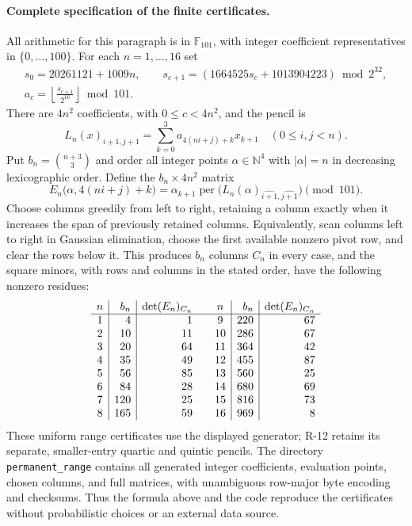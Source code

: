\paragraph{Complete specification of the finite certificates.}
All arithmetic for this paragraph is in $\mathbb F_{101}$, with
integer coefficient representatives in $\{0,\ldots,100\}$.
For each $n=1,\ldots,16$ set
\[
\begin{gathered}
 s_0=20261121+1009n,\qquad
 s_{c+1}=(1664525s_c+1013904223)\bmod2^{32},\\
 a_c=\left\lfloor\frac{s_{c+1}}{2^{16}}\right\rfloor\bmod101.
\end{gathered}
\]
There are $4n^2$ coefficients, with $0\leq c<4n^2$, and the
pencil is
\[
 L_n(x)_{i+1,j+1}=\sum_{k=0}^3a_{4(ni+j)+k}x_{k+1}
 \quad(0\leq i,j<n).
\]
Put $b_n=\binom{n+3}{3}$ and order all integer points
$\alpha\in\mathbb N^4$ with $|\alpha|=n$ in decreasing
lexicographic order. Define the $b_n\times4n^2$ matrix
\begin{equation}\label{R13:evaluationmatrix}
 E_n\bigl(\alpha,4(ni+j)+k\bigr)
 =\alpha_{k+1}\operatorname{per}
   \bigl(L_n(\alpha)_{\widehat{i+1},\widehat{j+1}}\bigr)
 \pmod{101}.
\end{equation}
Choose columns greedily from left to right, retaining a column
exactly when it increases the span of previously retained columns.
Equivalently, scan columns left to right in Gaussian elimination,
choose the first available nonzero pivot row, and clear the rows
below it. This produces $b_n$ columns $C_n$ in every case, and the
square minors, with rows and columns in the stated order, have
the following nonzero residues:
\[
\begin{array}{c|r|r@{\qquad}c|r|r}
n&b_n&\det(E_n)_{C_n}&n&b_n&\det(E_n)_{C_n}\\\hline
1&4&1&9&220&67\\
2&10&11&10&286&67\\
3&20&64&11&364&42\\
4&35&49&12&455&87\\
5&56&85&13&560&25\\
6&84&28&14&680&69\\
7&120&25&15&816&73\\
8&165&59&16&969&8
\end{array}
\]
These uniform range certificates use the displayed generator;
R-12 retains its separate, smaller-entry quartic and quintic pencils.
The directory \texttt{permanent\_range} contains all generated
integer coefficients, evaluation points, chosen columns, and full
matrices, with unambiguous row-major byte encoding and checksums.
Thus the formula above and the code reproduce the certificates
without probabilistic choices or an external data source.

